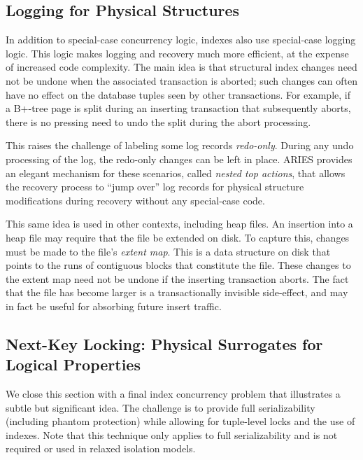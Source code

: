 \documentclass[a4paper,11pt,twoside,openright]{book}
\begin{document}
\hypertarget{logging-for-physical-structures}{%
\subsection{Logging for Physical
Structures}\label{logging-for-physical-structures}}

In addition to special-case concurrency logic, indexes also use
special-case logging logic. This logic makes logging and recovery much
more efficient, at the expense of increased code complexity. The main
idea is that structural index changes need not be undone when the
associated transaction is aborted; such changes can often have no effect
on the database tuples seen by other transactions. For example, if a
B+-tree page is split during an inserting transaction that subsequently
aborts, there is no pressing need to undo the split during the abort
processing.

This raises the challenge of labeling some log records \emph{redo-only}.
During any undo processing of the log, the redo-only changes can be left
in place. ARIES provides an elegant mechanism for these scenarios,
called \emph{nested top actions}, that allows the recovery process to
``jump over'' log records for physical structure modifications during
recovery without any special-case code.

This same idea is used in other contexts, including heap files. An
insertion into a heap file may require that the file be extended on
disk. To capture this, changes must be made to the file's \emph{extent
map}. This is a data structure on disk that points to the runs of
contiguous blocks that constitute the file. These changes to the extent
map need not be undone if the inserting transaction aborts. The fact
that the file has become larger is a transactionally invisible
side-effect, and may in fact be useful for absorbing future insert
traffic.

\hypertarget{next-key-locking-physical-surrogates-for-logical-properties}{%
\subsection{Next-Key Locking: Physical Surrogates for Logical
Properties}\label{next-key-locking-physical-surrogates-for-logical-properties}}

We close this section with a final index concurrency problem that
illustrates a subtle but significant idea. The challenge is to provide
full serializability (including phantom protection) while allowing for
tuple-level locks and the use of indexes. Note that this technique only
applies to full serializability and is not required or used in relaxed
isolation models.
\end{document}

